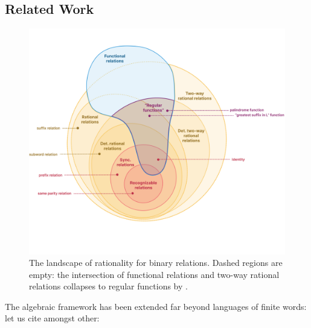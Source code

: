\subsection{Related Work}
\label{sec:algebra-related-work}

\begin{figure}[htb]
	\centering
	\includegraphics[width=\linewidth]{fig/algebra/landscape.png}
	\caption{
		\AP\label{fig:landscape-rationality} The landscape of rationality for binary relations.
		Dashed regions are empty: the intersection of
		functional relations and two-way rational relations
		collapses to regular functions by
		\cite[Theorem 22, p.~243]{EngelfrietHoogeboom2001MSOTransductions}.
	}
\end{figure}
The algebraic framework has been extended far beyond languages of finite words: let us cite amongst other:

